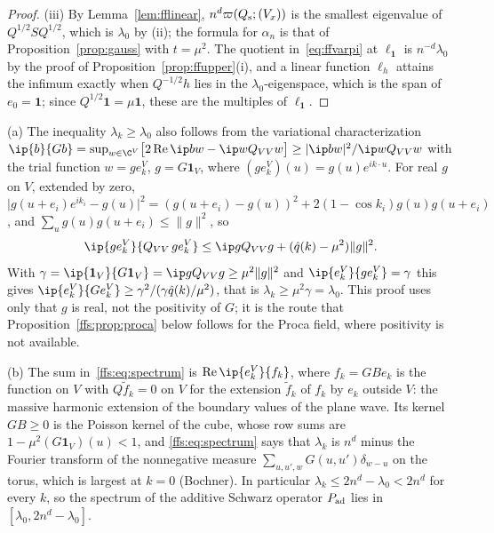 \begin{proof}
(iii) By Lemma~\ref{lem:fflinear}, $n^d\varpi(Q_{\rm s};(V_x))$ is the smallest
eigenvalue of $Q^{1/2}SQ^{1/2}$, which is $\lambda_0$ by (ii); the formula for
$\alpha_n$ is that of Proposition~\ref{prop:gauss} with $t=\mu^2$. The quotient
in~\eqref{eq:ffvarpi} at $\ell_{\mathbf 1}$ is $n^{-d}\lambda_0$ by the proof
of Proposition~\ref{prop:ffupper}(i), and a linear function $\ell_h$ attains
the infimum exactly when $Q^{-1/2}h$ lies in the $\lambda_0$-eigenspace, which
is the span of $e_0=\mathbf 1$; since $Q^{1/2}\mathbf 1=\mu\mathbf 1$, these are
the multiples of $\ell_{\mathbf 1}$.
\end{proof}

\begin{remark}\label{ffs:rem:variational}
(a) The inequality $\lambda_k\ge\lambda_0$ also follows from the variational
characterization $\ip{b}{Gb}=\sup_{w\in\C^V}\bigl[2\operatorname{Re}\ip bw-\ip
w{Q_{VV}w}\bigr]\ge\lvert\ip bw\rvert^2/\ip w{Q_{VV}w}$ with the trial
function $w=ge_k^V$, $g=G\mathbf 1_V$, where $(ge_k^V)(u)=g(u)e^{ik\cdot u}$.
For real $g$ on $V$, extended by zero, $\lvert g(u+e_i)e^{ik_i}-g(u)\rvert^2=
(g(u+e_i)-g(u))^2+2(1-\cos k_i)g(u)g(u+e_i)$, and $\sum_ug(u)g(u+e_i)\le\lVert
g\rVert^2$, so
\[
\ip{ge_k^V}{Q_{VV}\,ge_k^V}\le\ip g{Q_{VV}g}+(\hat q(k)-\mu^2)\lVert g\rVert^2 .
\]
With $\gamma=\ip{\mathbf 1_V}{G\mathbf 1_V}=\ip g{Q_{VV}g}\ge\mu^2\lVert g
\rVert^2$ and $\ip{e_k^V}{ge_k^V}=\gamma$ this gives $\ip{e_k^V}{Ge_k^V}\ge
\gamma^2/(\gamma\hat q(k)/\mu^2)$, that is $\lambda_k\ge\mu^2\gamma=\lambda_0$.
This proof uses only that $g$ is real, not the positivity of $G$; it is the
route that Proposition~\ref{ffs:prop:proca} below follows for the Proca field,
where positivity is not available.

(b) The sum in~\eqref{ffs:eq:spectrum} is $\operatorname{Re}\ip{e_k^V}{f_k}$,
where $f_k=GBe_k$ is the function on $V$ with $Q\tilde f_k=0$ on $V$ for the
extension $\tilde f_k$ of $f_k$ by $e_k$ outside $V$: the massive harmonic
extension of the boundary values of the plane wave. Its kernel $GB\ge0$ is the
Poisson kernel of the cube, whose row sums are $1-\mu^2(G\mathbf 1_V)(u)<1$,
and \eqref{ffs:eq:spectrum} says that $\lambda_k$ is $n^d$ minus the Fourier
transform of the nonnegative measure $\sum_{u,u',w}G(u,u')\delta_{w-u}$ on the
torus, which is largest at $k=0$ (Bochner). In particular $\lambda_k\le2n^d-
\lambda_0<2n^d$ for every $k$, so the spectrum of the additive Schwarz operator
$P_{\rm ad}$ lies in $[\lambda_0,2n^d-\lambda_0]$.
\end{remark}

